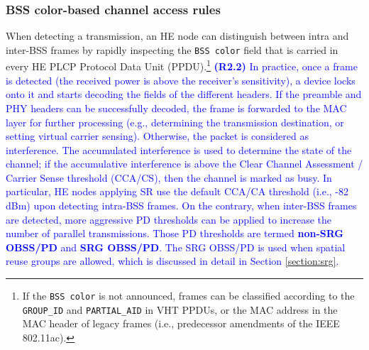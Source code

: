 \documentclass{ieeeaccess}
\begin{document}
\subsubsection{BSS color-based channel access rules}
\label{section:bss_color_channel_access}
When detecting a transmission, an HE node can distinguish between intra and inter-BSS frames by rapidly inspecting the \texttt{BSS color} field that is carried in every HE PLCP Protocol Data Unit (PPDU).\footnote{If the \texttt{BSS color} is not announced, frames can be classified according to the \texttt{GROUP\_ID} and \texttt{PARTIAL\_AID} in VHT PPDUs, or the MAC address in the MAC header of legacy frames (i.e., predecessor amendments of the IEEE 802.11ac).} \textcolor{blue}{\textbf{(R2.2)} In practice, once a frame is detected (the received power is above the receiver's sensitivity), a device locks onto it and starts decoding the fields of the different headers. If the preamble and PHY headers can be successfully decoded, the frame is forwarded to the MAC layer for further processing (e.g., determining the transmission destination, or setting virtual carrier sensing). Otherwise, the packet is considered as interference. The accumulated interference is used to determine the state of the channel; if the accumulative interference is above the Clear Channel Assessment / Carrier Sense threshold (CCA/CS), then the channel is marked as busy. In particular, HE nodes applying SR use the default CCA/CA threshold (i.e., -82 dBm) upon detecting intra-BSS frames. On the contrary, when inter-BSS frames are detected, more aggressive PD thresholds can be applied to increase the number of parallel transmissions. Those PD thresholds are termed \textbf{non-SRG OBSS/PD} and \textbf{SRG OBSS/PD}. The SRG OBSS/PD is used when spatial reuse groups are allowed, which is discussed in detail in Section \ref{section:srg}.}
\end{document}
